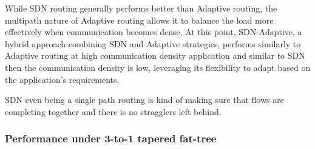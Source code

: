 While SDN routing generally performs better than Adaptive routing, the multipath nature of Adaptive routing allows it to balance the load more effectively when communication becomes dense. At this point, SDN-Adaptive, a hybrid approach combining SDN and Adaptive strategies, performs similarly to Adaptive routing at high communication density application and similar to SDN then the communication density is low, leveraging its flexibility to adapt based on the application's requirements.

SDN even being a single path routing is kind of making sure that flows are completing together and there is no stragglers left behind. 


\subsubsection{Performance under 3-to-1 tapered fat-tree}



